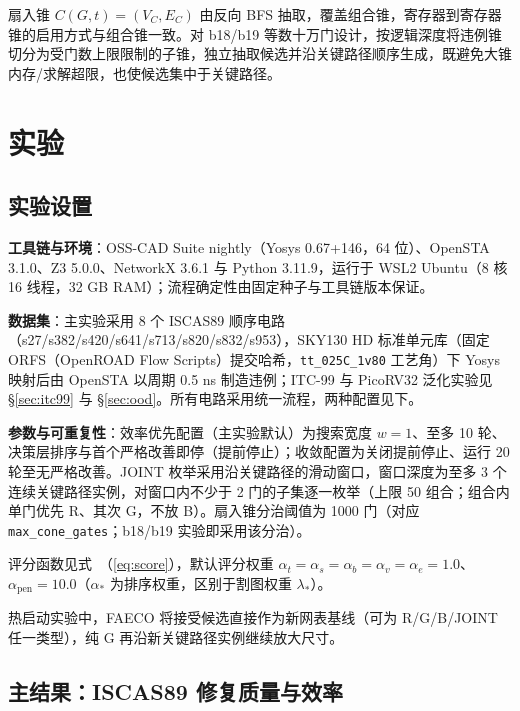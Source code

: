 \documentclass[journal]{IEEEtran}
\renewcommand{\eqref}[1]{\textup{（\ref{#1}）}}
\begin{document}
扇入锥 $C(G, t) = (V_C, E_C)$ 由反向 BFS 抽取，覆盖组合锥，寄存器到寄存器锥的启用方式与组合锥一致。对 b18/b19 等数十万门设计，按逻辑深度将违例锥切分为受门数上限限制的子锥，独立抽取候选并沿关键路径顺序生成，既避免大锥内存/求解超限，也使候选集中于关键路径。

\section{实验}\label{sec:exp}

\subsection{实验设置}\label{sec:setup}

\textbf{工具链与环境}：OSS-CAD Suite nightly（Yosys 0.67+146，64 位）、OpenSTA 3.1.0、Z3 5.0.0、NetworkX 3.6.1 与 Python 3.11.9，运行于 WSL2 Ubuntu（8 核 16 线程，32 GB RAM）；流程确定性由固定种子与工具链版本保证。

\textbf{数据集}：主实验采用 8 个 ISCAS89 顺序电路（s27/s382/s420/s641/s713/s820/s832/s953），SKY130 HD 标准单元库（固定 ORFS（OpenROAD Flow Scripts）提交哈希，\texttt{tt\_025C\_1v80} 工艺角）下 Yosys 映射后由 OpenSTA 以周期 0.5 ns 制造违例；ITC-99 与 PicoRV32 泛化实验见 \S\ref{sec:itc99} 与 \S\ref{sec:ood}。所有电路采用统一流程，两种配置见下。

\textbf{参数与可重复性}：效率优先配置（主实验默认）为搜索宽度 $w=1$、至多 10 轮、决策层排序与首个严格改善即停（提前停止）；收敛配置为关闭提前停止、运行 20 轮至无严格改善。JOINT 枚举采用沿关键路径的滑动窗口，窗口深度为至多 3 个连续关键路径实例，对窗口内不少于 2 门的子集逐一枚举（上限 50 组合；组合内单门优先 R、其次 G，不放 B）。扇入锥分治阈值为 1000 门（对应 \texttt{max\_cone\_gates}；b18/b19 实验即采用该分治）。

评分函数见式~\eqref{eq:score}，默认评分权重 $\alpha_t=\alpha_s=\alpha_b=\alpha_v=\alpha_e=1.0$、$\alpha_{\mathrm{pen}}=10.0$（$\alpha_*$ 为排序权重，区别于割图权重 $\lambda_*$）。

热启动实验中，FAECO 将接受候选直接作为新网表基线（可为 R/G/B/JOINT 任一类型），纯 G 再沿新关键路径实例继续放大尺寸。

\subsection{主结果：ISCAS89 修复质量与效率}\label{sec:iscas}
\end{document}
